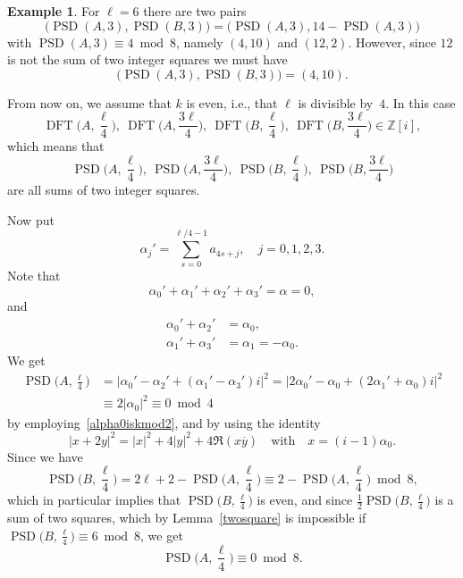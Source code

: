 \documentclass{article}
\theoremstyle{definition}
\newtheorem{example}[theorem]{Example}
\newcommand{\DFT}{\operatorname{DFT}}
\newcommand{\PSD}{\operatorname{PSD}}
\begin{document}
\begin{example}\label{ex4}
For $\ell=6$ there are two pairs
\[
  \bigl(\PSD(A,3),\PSD(B,3)\bigr)=\bigl(\PSD(A,3),14-\PSD(A,3)\bigr)
\]
with $\PSD(A,3)\equiv 4\bmod 8$, namely $(4,10)$ and $(12,2)$. However, since $12$ is not the sum of two integer squares we must have 
$$\bigl(\PSD(A,3),\PSD(B,3)\bigr)=(4,10).$$
\end{example}

From now on, we assume that $k$ is even, i.e., that $\ell$ is divisible by~$4$. In this case 
\[
  \DFT\biggl(A,\frac{\ell}{4}\biggr),\ 
  \DFT\biggl(A,\frac{3\ell}{4}\biggr),\
  \DFT\biggl(B,\frac{\ell}{4}\biggr),\
  \DFT\biggl(B,\frac{3\ell}{4}\biggr)\in \mathbb{Z}[i],
\]
which means that
\begin{equation}\label{PSD14}
  \PSD\biggl(A,\frac{\ell}{4}\biggr),\
  \PSD\biggl(A,\frac{3\ell}{4}\biggr),\ 
  \PSD\biggl(B,\frac{\ell}{4}\biggr),\ 
  \PSD\biggl(B,\frac{3\ell}{4}\biggr)
\end{equation}
 are all sums of two integer squares.

Now put 
$$\alpha_j'=\sum_{s=0}^{\ell/4-1}a_{4s+j},\quad j=0,1,2,3.$$
Note that 
$$\alpha_0'+\alpha_1'+\alpha_2'+\alpha_3'=\alpha=0,$$
and
\begin{align*}
  \alpha_0'+\alpha_2' &= \alpha_0, \\
  \alpha_1'+\alpha_3' &= \alpha_1=-\alpha_0.
\end{align*}
We get
\begin{align*}
    \PSD\biggl(A,\frac{\ell}{4}\biggr) &= \bigl|\alpha_0'-\alpha_2'+(\alpha_1'-\alpha_3')i\bigr|^2=\bigl|2\alpha_0'-\alpha_0+(2\alpha_1'+\alpha_0)i\bigr|^2 \\
    &\equiv 2|\alpha_0|^2\equiv 0 \bmod 4
\end{align*}
by employing~\eqref{alpha0iskmod2}, and by using the identity
$$|x+2y|^2=|x|^2+4|y|^2+4 \Re(x\overline{y})\quad \mbox{with}\quad x=(i-1)\alpha_0.$$
Since we have
$$\PSD\biggl(B,\frac{\ell}{4}\biggr)=2\ell+2-\PSD\biggl(A,\frac{\ell}{4}\biggr)\equiv 2-\PSD\biggl(A,\frac{\ell}{4}\biggr)\bmod 8,$$
which in particular implies that $\PSD\bigl(B,\frac{\ell}{4}\bigr)$ is even,
and since $\frac12\PSD\bigl(B,\frac{\ell}{4}\bigr)$ is a sum of two squares, which by Lemma~\ref{twosquare} is impossible if $\PSD\bigl(B,\frac{\ell}{4}\bigr)\equiv 6 \bmod 8$, we get
\begin{equation}\label{0mod8}
\PSD\biggl(A,\frac{\ell}{4}\biggr)\equiv 0\bmod 8.
\end{equation}
\end{document}
